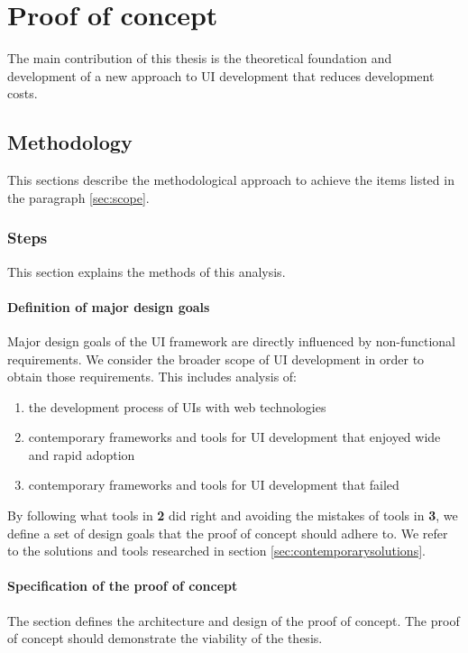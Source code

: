 \section{Proof of concept}\label{sec:proofofconcept}
The main contribution of this thesis is the theoretical foundation and development of a new approach to UI development that reduces development costs.

\subsection{Methodology}
This sections describe the methodological approach to achieve the items listed in the paragraph \ref{sec:scope}.

\subsubsection{Steps}
This section explains the methods of this analysis.

\paragraph{Definition of major design goals}
Major design goals of the UI framework are directly influenced by non-functional requirements. We consider the broader scope of UI development in order to obtain those requirements. This includes analysis of:

\begin{enumerate}
  \item the development process of UIs with web technologies
  \item contemporary frameworks and tools for UI development that enjoyed wide and rapid adoption
  \item contemporary frameworks and tools for UI development that failed
\end{enumerate}

By following what tools in \textbf{2} did right and avoiding the mistakes of tools in \textbf{3}, we define a set of design goals that the proof of concept should adhere to. We refer to the solutions and tools researched in section \ref{sec:contemporarysolutions}.

\paragraph{Specification of the proof of concept}
The section defines the architecture and design of the proof of concept. The proof of concept should demonstrate the viability of the thesis.

